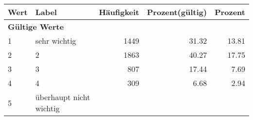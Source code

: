      \begin{longtable}{lXrrr}
     \toprule
     \textbf{Wert} & \textbf{Label} & \textbf{Häufigkeit} & \textbf{Prozent(gültig)} & \textbf{Prozent} \\
     \endhead
     \midrule
     \multicolumn{5}{l}{\textbf{Gültige Werte}}\\

     1 &
     \multicolumn{1}{X}{ sehr wichtig   } &


       \num{1449} &
       \num[round-mode=places,round-precision=2]{31.32} &
         \num[round-mode=places,round-precision=2]{13.81} \\

     2 &
     \multicolumn{1}{X}{ 2   } &


       \num{1863} &
       \num[round-mode=places,round-precision=2]{40.27} &
         \num[round-mode=places,round-precision=2]{17.75} \\

     3 &
     \multicolumn{1}{X}{ 3   } &


       \num{807} &
       \num[round-mode=places,round-precision=2]{17.44} &
         \num[round-mode=places,round-precision=2]{7.69} \\

     4 &
     \multicolumn{1}{X}{ 4   } &


       \num{309} &
       \num[round-mode=places,round-precision=2]{6.68} &
         \num[round-mode=places,round-precision=2]{2.94} \\

     5 &
     \multicolumn{1}{X}{ überhaupt nicht wichtig   } &



\end{longtable}
